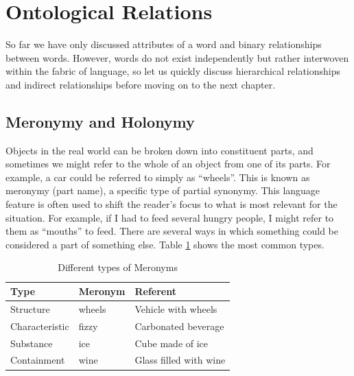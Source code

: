 

\section{Ontological Relations}

So far we have only discussed attributes of a word and binary relationships between words. However, words do not exist independently but rather interwoven within the fabric of language, so let us quickly discuss hierarchical relationships and indirect relationships before moving on to the next chapter.

\subsection{Meronymy and Holonymy}

Objects in the real world can be broken down into constituent parts, and sometimes we might refer to the whole of an object from one of its parts. For example, a car could be referred to simply as ``wheels''. This is known as meronymy (part name), a specific type of partial synonymy. This language feature is often used to shift the reader's focus to what is most relevant for the situation. For example, if I had to feed several hungry people, I might refer to them as ``mouths'' to feed. There are several ways in which something could be considered a part of something else. Table \ref{meronymyholonymy} shows the most common types.


\begin{table}[h]
\centering
\begin{tabular}{|l|l|l|}
\hline
\textbf{Type}  & \textbf{Meronym}   & \textbf{Referent}    \\ \hline
Structure      & wheels  & Vehicle with wheels \\
Characteristic & fizzy   & Carbonated beverage \\
Substance      & ice     & Cube made of ice   \\
Containment    & wine    & Glass filled with wine \\ \hline
\end{tabular}
\caption{Different types of Meronyms}
\label{meronymyholonymy}
\end{table}

